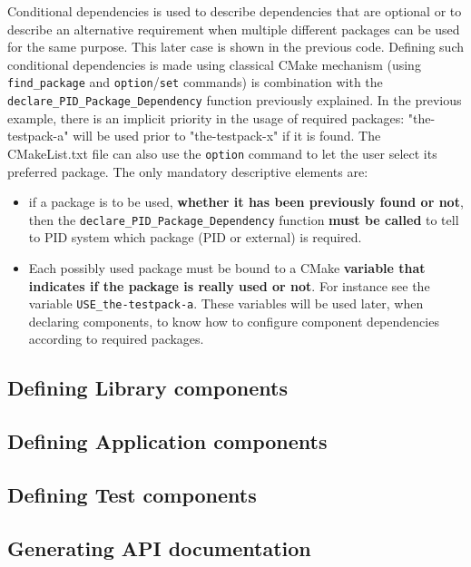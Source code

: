 \documentclass[12pt,a4paper]{article}
\begin{document}
Conditional dependencies is used to describe dependencies that are optional or to describe an alternative requirement when multiple different packages can be used for the same purpose. This later case is shown in the previous code. Defining such conditional dependencies is made using classical CMake mechanism (using \texttt{find\_package} and \texttt{option}/\texttt{set} commands) is combination with the \texttt{declare\_PID\_Package\_Dependency} function previously explained. In the previous example, there is an implicit priority in the usage of required packages: "the-testpack-a" will be used prior to "the-testpack-x" if it is found. The CMakeList.txt file can also use the \texttt{option} command to let the user select its preferred package. The only mandatory descriptive elements are:
\begin{itemize}
\item if a package is to be used, \textbf{whether it has been previously found or not}, then the \texttt{declare\_PID\_Package\_Dependency} function \textbf{must be called} to tell to PID system which package (PID or external) is required.
\item Each possibly used package must be bound to a CMake \textbf{variable that indicates if the package is really used or not}. For instance see the variable \texttt{USE\_the-testpack-a}. These variables will be used later, when declaring components, to know how to configure component dependencies according to required packages.
\end{itemize}

\subsection{Defining Library components}



\label{sec:libCMake}

\subsection{Defining Application components}
\label{sec:appCMake}

\subsection{Defining Test components}
\label{sec:testCMake}

\subsection{Generating API documentation}
\label{sec:apiCMake}
\end{document}
